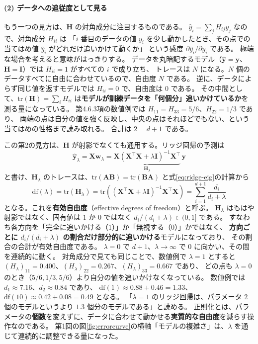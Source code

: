 \paragraph{(2) データへの追従度として見る}
もう一つの見方は、$\bm{H}$ の対角成分に注目するものである。
$\hat{y}_i = \sum_j H_{ij} y_j$ なので、対角成分 $H_{ii}$ は
「$i$ 番目のデータの値 $y_i$ を少し動かしたとき、その点での当てはめ値 $\hat{y}_i$ がどれだけ追いかけて動くか」
という感度 $\partial\hat{y}_i/\partial y_i$ である。
極端な場合を考えると意味がはっきりする。
データを丸暗記するモデル（$\hat{\bm{y}} = \bm{y}$、$\bm{H} = \bm{I}$）では $H_{ii} = 1$ がすべての $i$ で成り立ち、
トレースは $N$ になる。$N$ 個のデータすべてに自由に合わせているので、自由度 $N$ である。
逆に、データによらず同じ値を返すモデルでは $H_{ii} = 0$ で、自由度は $0$ である。
その中間として、$\mathrm{tr}(\bm{H}) = \sum_i H_{ii}$ は\textbf{モデルが訓練データを「何個分」追いかけているか}を測る量になっている。
第4.6.3項の数値例では $H_{11} = H_{33} = 5/6$、$H_{22} = 1/3$ であり、
両端の点は自分の値を強く反映し、中央の点はそれほどでもない、という当てはめの性格まで読み取れる。
合計は $2 = d+1$ である。

この第2の見方は、$\bm{H}$ が射影でなくても通用する。リッジ回帰の予測は
\begin{equation}
  \hat{\bm{y}}_\lambda = \bm{X}\bm{w}_\lambda = \underbrace{\bm{X}(\bm{X}^\top\bm{X} + \lambda\bm{I})^{-1}\bm{X}^\top}_{\bm{H}_\lambda}\,\bm{y}
\end{equation}
と書け、$\bm{H}_\lambda$ のトレースは、$\mathrm{tr}(\bm{A}\bm{B}) = \mathrm{tr}(\bm{B}\bm{A})$ と式\eqref{eq:ridge-eig}の計算から
\begin{equation}
  \mathrm{df}(\lambda) = \mathrm{tr}(\bm{H}_\lambda)
  = \mathrm{tr}\left( (\bm{X}^\top\bm{X} + \lambda\bm{I})^{-1}\bm{X}^\top\bm{X} \right)
  = \sum_{i=1}^{d+1} \frac{d_i}{d_i + \lambda}
  \label{eq:ridge-df}
\end{equation}
となる。これを\textbf{有効自由度}（effective degrees of freedom）と呼ぶ。
$\bm{H}_\lambda$ はもはや射影ではなく、固有値は $1$ か $0$ ではなく $d_i/(d_i + \lambda) \in (0, 1]$ である。
すなわち各方向を「完全に追いかける（$1$）」か「無視する（$0$）」かではなく、
\textbf{方向ごとに $d_i/(d_i + \lambda)$ の割合だけ部分的に追いかける}モデルになっており、
その割合の合計が有効自由度である。
$\lambda = 0$ で $d+1$、$\lambda \to \infty$ で $0$ に向かい、その間を連続的に動く。
対角成分で見ても同じことで、数値例で $\lambda = 1$ とすると $(H_\lambda)_{11} = 0.400$、$(H_\lambda)_{22} = 0.267$、$(H_\lambda)_{33} = 0.667$ であり、
どの点も $\lambda = 0$ のとき（$5/6, 1/3, 5/6$）より自分の値を追いかけなくなっている。
数値例では $d_1 \approx 7.16$、$d_2 \approx 0.84$ であり、
$\mathrm{df}(1) \approx 0.88 + 0.46 = 1.33$、$\mathrm{df}(10) \approx 0.42 + 0.08 = 0.49$ となる。
「$\lambda = 1$ のリッジ回帰は、パラメータ $2$ 個のモデルというより $1.3$ 個分のモデルである」と読める。
正則化とは、パラメータの\textbf{個数}を変えずに、データに合わせて動かせる\textbf{実質的な自由度}を減らす操作なのである。
第1回の図\ref{fig:errorcurve}の横軸「モデルの複雑さ」は、$\lambda$ を通じて連続的に調整できる量になった。

